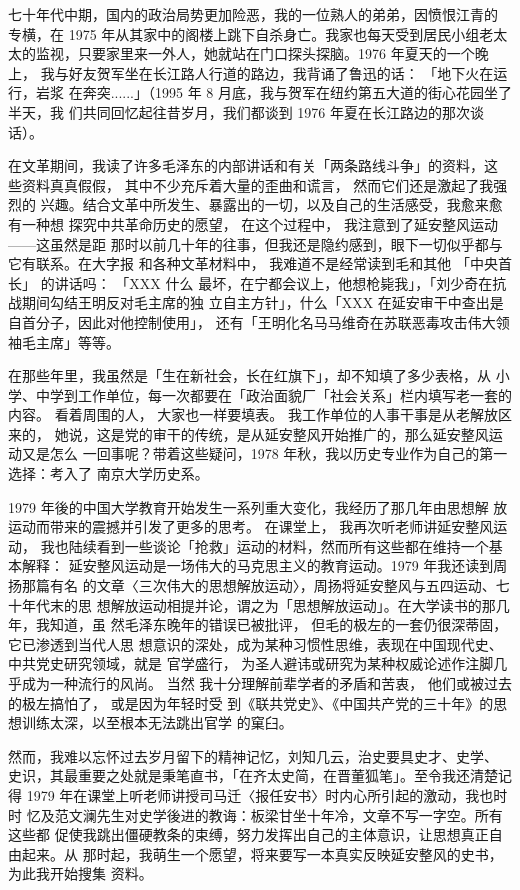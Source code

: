 \begin{preface}
七十年代中期，国内的政治局势更加险恶，我的一位熟人的弟弟，因愤恨江青的
专横，在 1975 年从其家中的阁楼上跳下自杀身亡。我家也每天受到居民小组老太
太的监视，只要家里来一外人，她就站在门口探头探脑。1976 年夏天的一个晚上，
我与好友贺军坐在长江路人行道的路边，我背诵了鲁迅的话：
「地下火在运行，岩浆
在奔突......」（1995 年 8 月底，我与贺军在纽约第五大道的街心花园坐了半天，我
们共同回忆起往昔岁月，我们都谈到 1976 年夏在长江路边的那次谈话）。

在文革期间，我读了许多毛泽东的内部讲话和有关「两条路线斗争」的资料，这
些资料真真假假，
其中不少充斥着大量的歪曲和谎言，
然而它们还是激起了我强烈的
兴趣。结合文革中所发生、暴露出的一切，以及自己的生活感受，我愈来愈有一种想
探究中共革命历史的愿望，
在这个过程中，
我注意到了延安整风运动——这虽然是距
那时以前几十年的往事，但我还是隐约感到，眼下一切似乎都与它有联系。在大字报
和各种文革材料中，
我难道不是经常读到毛和其他
「中央首长」
的讲话吗： 「XXX
什么
最坏，在宁都会议上，他想枪毙我」，「刘少奇在抗战期间勾结王明反对毛主席的独
立自主方针」，什么「XXX 在延安审干中查出是自首分子，因此对他控制使用」，
还有「王明化名马马维奇在苏联恶毒攻击伟大领袖毛主席」等等。

在那些年里，我虽然是「生在新社会，长在红旗下」，却不知填了多少表格，从
小学、中学到工作单位，每一次都要在「政治面貌厂「社会关系」栏内填写老一套的
内容。
看着周围的人，
大家也一样要填表。
我工作单位的人事干事是从老解放区来的，
她说，这是党的审干的传统，是从延安整风开始推广的，那么延安整风运动又是怎么
一回事呢？带着这些疑问，1978 年秋，我以历史专业作为自己的第一选择：考入了
南京大学历史系。

1979 年後的中国大学教育开始发生一系列重大变化，我经历了那几年由思想解
放运动而带来的震撼并引发了更多的思考。
在课堂上，
我再次听老师讲延安整风运动，
我也陆续看到一些谈论「抢救」运动的材料，然而所有这些都在维持一个基本解释：
延安整风运动是一场伟大的马克思主义的教育运动。1979 年我还读到周扬那篇有名
的文章〈三次伟大的思想解放运动〉，周扬将延安整风与五四运动、七十年代末的思
想解放运动相提并论，谓之为「思想解放运动」。在大学读书的那几年，我知道，虽
然毛泽东晚年的错误已被批评，
但毛的极左的一套仍很深蒂固，
它已渗透到当代人思
想意识的深处，成为某种习惯性思维，表现在中国现代史、中共党史研究领域，就是
官学盛行，
为圣人避讳或研究为某种权威论述作注脚几乎成为一种流行的风尚。
当然
我十分理解前辈学者的矛盾和苦衷，
他们或被过去的极左搞怕了，
或是因为年轻时受
到《联共党史》、《中国共产党的三十年》的思想训练太深，以至根本无法跳出官学
的窠臼。

然而，我难以忘怀过去岁月留下的精神记忆，刘知几云，治史要具史才、史学、
史识，其最重要之处就是秉笔直书，「在齐太史简，在晋董狐笔」。至令我还清楚记
得 1979 年在课堂上听老师讲授司马迁〈报任安书〉时内心所引起的激动，我也时时
忆及范文澜先生对史学後进的教诲：板梁甘坐十年冷，文章不写一字空。所有这些都
促使我跳出僵硬教条的束缚，努力发挥出自己的主体意识，让思想真正自由起来。从
那时起，我萌生一个愿望，将来要写一本真实反映延安整风的史书，为此我开始搜集
资料。


\end{preface}
